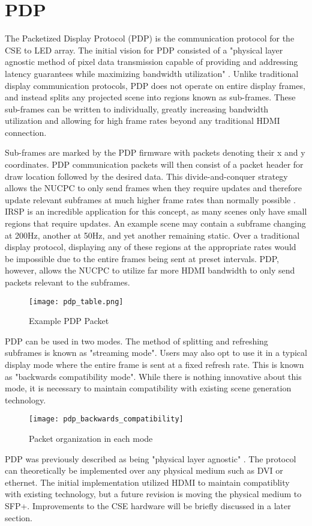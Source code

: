 \section{PDP}
The Packetized Display Protocol (PDP) is the communication protocol for the CSE to LED array. The initial vision for PDP consisted of a "physical layer agnostic method of pixel data transmission capable of providing and addressing latency guarantees while maximizing bandwidth utilization" \cite{pdp_ieee}. Unlike traditional display communication protocols, PDP does not operate on entire display frames, and instead splits any projected scene into regions known as sub-frames. These sub-frames can be written to individually, greatly increasing bandwidth utilization and allowing for high frame rates beyond any traditional HDMI connection. \par
Sub-frames are marked by the PDP firmware with packets denoting their x and y coordinates. PDP communication packets will then consist of a packet header for draw location followed by the desired data. This divide-and-conquer strategy allows the NUCPC to only send frames when they require updates and therefore update relevant subframes at much higher frame rates than normally possible \cite{chris}. IRSP is an incredible application for this concept, as many scenes only have small regions that require updates. An example scene may contain a subframe changing at 200Hz, another at 50Hz, and yet another remaining static. Over a traditional display protocol, displaying any of these regions at the appropriate rates would be impossible due to the entire frames being sent at preset intervals. PDP, however, allows the NUCPC to utilize far more HDMI bandwidth to only send packets relevant to the subframes.\par
\begin{figure}[!htb]
	\texttt{[image: pdp\_table.png]}
	\centering
	\caption{Example PDP Packet \cite{chris}}
	\centering
\end{figure}
PDP can be used in two modes. The method of splitting and refreshing subframes is known as "streaming mode". Users may also opt to use it in a typical display mode where the entire frame is sent at a fixed refresh rate. This is known as "backwards compatibility mode". While there is nothing innovative about this mode, it is necessary to maintain compatibility with existing scene generation technology.\par
\begin{figure}[!htb]
	\texttt{[image: pdp\_backwards\_compatibility]}
	\centering
	\caption{Packet organization in each mode \cite{chris}}
	\centering
\end{figure}
PDP was previously described as being "physical layer agnostic" \cite{pdp_ieee}. The protocol can theoretically be implemented over any physical medium such as DVI or ethernet. The initial implementation utilized HDMI to maintain compatiblity with existing technology, but a future revision is moving the physical medium to SFP+. Improvements to the CSE hardware will be briefly discussed in a later section.